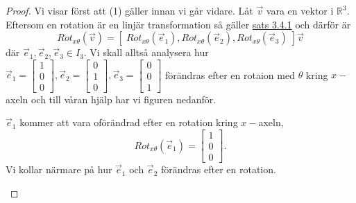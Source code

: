 \documentclass{article}
\theoremstyle{definition}
\begin{document}
\begin{proof}
  Vi visar först att (1) gäller innan vi går vidare. Låt $\vec{v}$ vara en vektor i $\mathbb{R}^3$. 
  Eftersom en rotation är en linjär transformation så gäller \hyperlink{linjarTsats}{sats 3.4.1} och 
  därför är
  \[Rot_{x\theta} (\vec{v}) = [\; Rot_{x\theta} (\vec{e}_1), Rot_{x\theta} (\vec{e}_2), 
  Rot_{x\theta} (\vec{e}_3)\;] \vec{v}\]
  där $\vec{e}_1, \vec{e}_2, \vec{e}_3 \in I_3.$
  Vi skall alltså analysera hur $\vec{e}_1 = 
  \begin{bmatrix}
    1 \\
    0 \\
    0
  \end{bmatrix}
  , \vec{e}_2 = 
  \begin{bmatrix}
    0 \\
    1 \\
    0
  \end{bmatrix}
  , \vec{e}_3 = 
  \begin{bmatrix}
    0 \\
    0\\
    1
  \end{bmatrix}
  $ förändras efter en rotaion med 
  $\theta$ kring $x-$axeln och till våran hjälp har vi figuren nedanför. 

  \newcommand{\AxisRotator}[1][rotate=0]{%
    \tikz [x=0.2cm,y=0.60cm,line width=.2ex,-stealth,#1] \draw (0,0) arc (-150:150:1 and 1);%
  }

  \begin{center}
  \end{center}
  $\vec{e}_1$ kommer att vara oförändrad efter en rotation kring $x-$axeln, 
  \[Rot_{x\theta}(\vec{e}_1) = 
  \begin{bmatrix}
    1 \\
    0 \\
    0
  \end{bmatrix}
  .\]
  Vi kollar närmare på hur $\vec{e}_1$ och $\vec{e}_2$ förändras efter en rotation. 
  \begin{center}
\end{center}
\end{proof}
\end{document}
